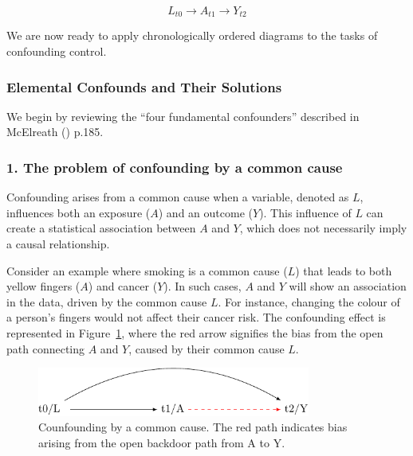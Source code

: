 \documentclass[
  singlecolumn,
  9pt]{article}
\begin{document}
\[L_{t0} \to A_{t1} \to Y_{t2}\]

We are now ready to apply chronologically ordered diagrams to the tasks
of confounding control.

\subsubsection{Elemental Confounds and Their
Solutions}\label{elemental-confounds-and-their-solutions}

We begin by reviewing the ``four fundamental confounders'' described in
McElreath () p.185.

\subsubsection{1. The problem of confounding by a common
cause}\label{the-problem-of-confounding-by-a-common-cause}

Confounding arises from a common cause when a variable, denoted as
\(L\), influences both an exposure (\(A\)) and an outcome (\(Y\)). This
influence of \(L\) can create a statistical association between \(A\)
and \(Y\), which does not necessarily imply a causal relationship.

Consider an example where smoking is a common cause (\(L\)) that leads
to both yellow fingers (\(A\)) and cancer (\(Y\)). In such cases, \(A\)
and \(Y\) will show an association in the data, driven by the common
cause \(L\). For instance, changing the colour of a person's fingers
would not affect their cancer risk. The confounding effect is
represented in Figure~\ref{fig-dag-common-cause}, where the red arrow
signifies the bias from the open path connecting \(A\) and \(Y\), caused
by their common cause \(L\).

\begin{figure}

{\centering \includegraphics[width=0.8\textwidth,height=\textheight]{causal-dags_files/figure-pdf/fig-dag-common-cause-1.pdf}

}

\caption{\label{fig-dag-common-cause}Counfounding by a common cause. The
red path indicates bias arising from the open backdoor path from A to
Y.}

\end{figure}
\end{document}
